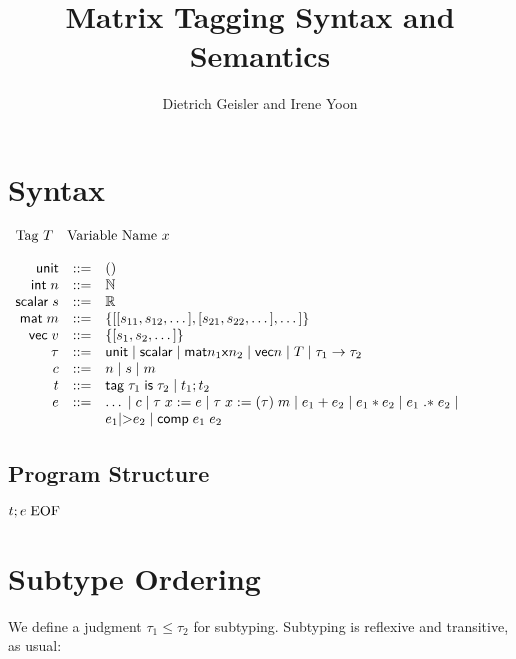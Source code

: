 \documentclass{article}
\begin{document}
\newcommand{\mat}{\mathsf{mat}n_1\textnormal{x}n_2}
\newcommand{\env}[1]{\langle#1,\sigma\rangle}

\mathlig{->}{\rightarrow}
\mathlig{|-}{\vdash}
\mathlig{=>}{\Rightarrow}
\mathligson

\title{Matrix Tagging Syntax and Semantics}
\author{Dietrich Geisler and Irene Yoon}

\section{Syntax}

$\begin{array}{cc}
\textnormal{Tag }T&\textnormal{Variable Name }x
\end{array}
$

$\begin{array}{rcl}
\mathsf{unit}&::=&()\\
\mathsf{int}\;n&::=&\mathbb{N}\\
\mathsf{scalar}\;s&::=&\mathbb{R}\\
\mathsf{mat}\;m&::=&\{[[s_{11},s_{12},\dots],[s_{21},s_{22},\dots],\dots]\}\\
\mathsf{vec}\;v&::=&\{[s_1,s_2,\dots]\}\\
\tau&::=&\mathsf{unit}\;|\;\mathsf{scalar}\;|\;\mathsf{mat}n_1\mathsf{x}n_2\;|\;\mathsf{vec}n\;|\;T\;|\;\tau_1->\tau_2\\
c&::=&n\;|\;s\;|\;m\\
t&::=&\mathsf{tag}\;\tau_1\;\mathsf{is}\;\tau_2\;|\;t_1;t_2\\
e&::=&\dots\;|\;c\;|\;\tau\;x:=e\;|\;\tau\;x:=(\tau)\;m\;|\;e_1+e_2\;|\;e_1*e_2\;|\;e_1\;\mathsf{.*}\;e_2\;|\\
&&e_1\textnormal{|>}e_2\;|\;\mathsf{comp}\;e_1\;e_2
\end{array}$

\subsection{Program Structure}
$t;e\;\textnormal{EOF}$\\

\section{Subtype Ordering}

We define a judgment $\tau_1 \leq \tau_2$ for subtyping.
Subtyping is reflexive and transitive, as usual:
\end{document}
